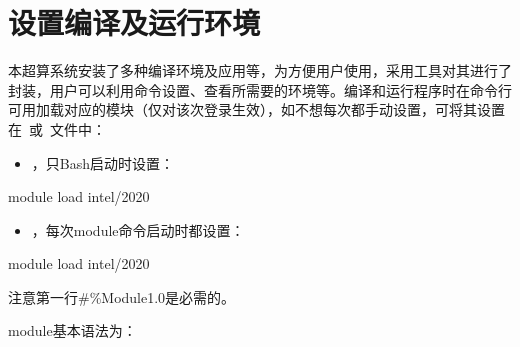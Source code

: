 \documentclass[a4paper,12pt,english]{sphinxmanual}
\begin{document}
\sphinxstepscope


\chapter{设置编译及运行环境}
\label{\detokenize{module-environment/module-environment:module}}\label{\detokenize{module-environment/module-environment:id1}}\label{\detokenize{module-environment/module-environment::doc}}
\sphinxAtStartPar
本超算系统安装了多种编译环境及应用等，为方便用户使用，采用工具对其进行了封装，用户可以利用命令设置、查看所需要的环境等。编译和运行程序时在命令行可用加载对应的模块（仅对该次登录生效），如不想每次都手动设置，可将其设置在 或 文件中：
\begin{itemize}
\item {} 
\sphinxAtStartPar
{} ，只Bash启动时设置：

\end{itemize}

\begin{sphinxVerbatim}[commandchars=\\\{\}]
module load intel/2020
\end{sphinxVerbatim}
\begin{itemize}
\item {} 
\sphinxAtStartPar
{} ，每次module命令启动时都设置：

\end{itemize}

\begin{sphinxVerbatim}[commandchars=\\\{\}]
module load intel/2020
\end{sphinxVerbatim}

\sphinxAtStartPar
注意第一行\#\%Module1.0是必需的。

\sphinxAtStartPar
module基本语法为：
\end{document}
